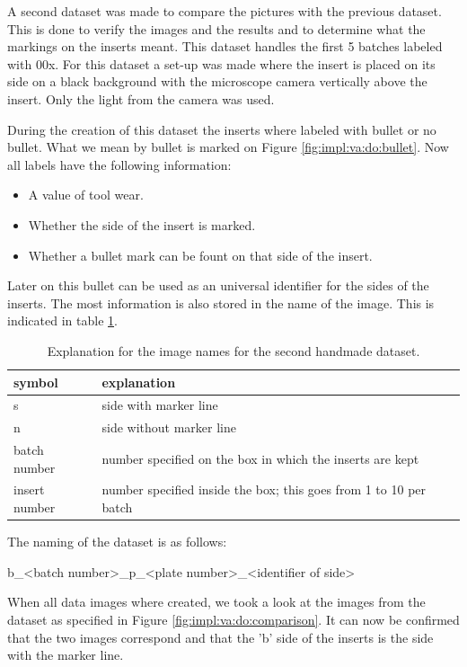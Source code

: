 			A second dataset was made to compare the pictures with the previous dataset. This is done to verify the images and the results and to determine what the markings on the inserts meant. This dataset handles the first 5 batches labeled with 00x. For this dataset a set-up was made where the insert is placed on its side on a black background with the microscope camera vertically above the insert. Only the light from the camera was used.

		During the creation of this dataset the inserts where labeled with bullet or no bullet. What we mean by bullet is marked on Figure \ref{fig:impl:va:do:bullet}. Now all labels have the following information:
		\begin{itemize}
			\item A value of tool wear.
			\item Whether the side of the insert is marked.
			\item Whether a bullet mark can be fount on that side of the insert.
\end{itemize}	

	Later on this bullet can be used as an universal identifier for the sides of the inserts. The most information is also stored in the name of the image. This is indicated in table \ref{tab:impl:dataset:shm:name}.
	
	\begin{table}
	\centering
	\caption{Explanation for the image names for the second handmade dataset. }
		\begin{tabular}{ |l|l| }
			\hline
 				symbol & explanation \tabularnewline
			\hline
			\hline
				 s & side with marker line \tabularnewline
			\hline
				 n & side without marker line \tabularnewline
			\hline
				 batch number & number specified on the box in which the inserts are kept \tabularnewline
			\hline
				 insert number & number specified inside the box; this goes from 1 to 10 per batch \tabularnewline
			\hline
		\end{tabular}
		\label{tab:impl:dataset:shm:name}
	\end{table}

		The naming of the dataset is as follows:

		b\_\textless{}batch number\textgreater{}\_p\_\textless{}plate number\textgreater{}\_\textless{}identifier of side\textgreater{}

		When all data images where created, we took a look at the images from the dataset as specified in Figure \ref{fig:impl:va:do:comparison}.  It can now be confirmed that the two images correspond and that the 'b' side of the inserts is the side with the marker line. 

